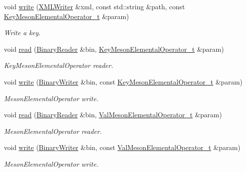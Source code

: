 \begin{DoxyCompactItemize}
void \mbox{\hyperlink{namespaceHadron_ad432e121844a2fa83775051e43481116}{write}} (\mbox{\hyperlink{classADATXML_1_1XMLWriter}{X\+M\+L\+Writer}} \&xml, const std\+::string \&path, const \mbox{\hyperlink{structHadron_1_1KeyMesonElementalOperator__t}{Key\+Meson\+Elemental\+Operator\+\_\+t}} \&param)
\begin{DoxyCompactList}\small\item\em Write a key. \end{DoxyCompactList}\item 
void \mbox{\hyperlink{namespaceHadron_ae6acb258c409e20fdd2a36b3266138bc}{read}} (\mbox{\hyperlink{classADATIO_1_1BinaryReader}{Binary\+Reader}} \&bin, \mbox{\hyperlink{structHadron_1_1KeyMesonElementalOperator__t}{Key\+Meson\+Elemental\+Operator\+\_\+t}} \&param)
\begin{DoxyCompactList}\small\item\em Key\+Meson\+Elemental\+Operator reader. \end{DoxyCompactList}\item 
void \mbox{\hyperlink{namespaceHadron_abb7bfe7ab47ecc24ac8d489bdaf701d2}{write}} (\mbox{\hyperlink{classADATIO_1_1BinaryWriter}{Binary\+Writer}} \&bin, const \mbox{\hyperlink{structHadron_1_1KeyMesonElementalOperator__t}{Key\+Meson\+Elemental\+Operator\+\_\+t}} \&param)
\begin{DoxyCompactList}\small\item\em Meson\+Elemental\+Operator write. \end{DoxyCompactList}\item 
void \mbox{\hyperlink{namespaceHadron_ae34c01603f5e8f9246374fddfaa8e062}{read}} (\mbox{\hyperlink{classADATIO_1_1BinaryReader}{Binary\+Reader}} \&bin, \mbox{\hyperlink{structHadron_1_1ValMesonElementalOperator__t}{Val\+Meson\+Elemental\+Operator\+\_\+t}} \&param)
\begin{DoxyCompactList}\small\item\em Meson\+Elemental\+Operator reader. \end{DoxyCompactList}\item 
void \mbox{\hyperlink{namespaceHadron_af16b79349f97386286cfc1cd9dfb73f0}{write}} (\mbox{\hyperlink{classADATIO_1_1BinaryWriter}{Binary\+Writer}} \&bin, const \mbox{\hyperlink{structHadron_1_1ValMesonElementalOperator__t}{Val\+Meson\+Elemental\+Operator\+\_\+t}} \&param)
\begin{DoxyCompactList}\small\item\em Meson\+Elemental\+Operator write. \end{DoxyCompactList}\item 

\end{DoxyCompactItemize}

